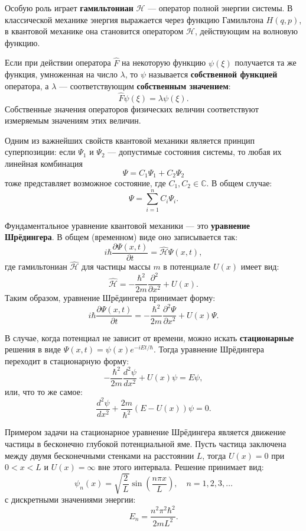 \documentclass[12pt]{article}
\begin{document}
Особую роль играет \textbf{гамильтониан} $\mathcal{H}$ — оператор полной энергии системы. В классической механике энергия выражается через функцию Гамильтона $H(q, p)$, в квантовой механике она становится оператором $\mathcal{H}$, действующим на волновую функцию.

Если при действии оператора $\hat{F}$ на некоторую функцию $\psi(\xi)$ получается та же функция, умноженная на число $\lambda$, то $\psi$ называется \textbf{собственной функцией} оператора, а $\lambda$ — соответствующим \textbf{собственным значением}:
\[
\hat{F} \psi(\xi) = \lambda \psi(\xi).
\]
Собственные значения операторов физических величин соответствуют измеряемым значениям этих величин.

Одним из важнейших свойств квантовой механики является принцип суперпозиции: если $\Psi_1$ и $\Psi_2$ — допустимые состояния системы, то любая их линейная комбинация
\[
\Psi = C_1 \Psi_1 + C_2 \Psi_2
\]
тоже представляет возможное состояние, где $C_1, C_2 \in \mathbb{C}$. В общем случае:
\[
\Psi = \sum_{i=1}^n C_i \Psi_i.
\]

Фундаментальное уравнение квантовой механики — это \textbf{уравнение Шрёдингера}. В общем (временном) виде оно записывается так:
\[
i\hbar \frac{\partial \Psi(x, t)}{\partial t} = \hat{\mathcal{H}} \Psi(x, t),
\]
где гамильтониан $\hat{\mathcal{H}}$ для частицы массы $m$ в потенциале $U(x)$ имеет вид:
\[
\hat{\mathcal{H}} = -\frac{\hbar^2}{2m} \frac{\partial^2}{\partial x^2} + U(x).
\]
Таким образом, уравнение Шрёдингера принимает форму:
\[
i\hbar \frac{\partial \Psi(x, t)}{\partial t} = -\frac{\hbar^2}{2m} \frac{\partial^2 \Psi}{\partial x^2} + U(x)\Psi.
\]

В случае, когда потенциал не зависит от времени, можно искать \textbf{стационарные} решения в виде $\Psi(x, t) = \psi(x)e^{-iEt/\hbar}$. Тогда уравнение Шрёдингера переходит в стационарную форму:
\[
-\frac{\hbar^2}{2m} \frac{d^2 \psi}{dx^2} + U(x)\psi = E\psi,
\]
или, что то же самое:
\[
\frac{d^2 \psi}{dx^2} + \frac{2m}{\hbar^2}(E - U(x))\psi = 0.
\]

Примером задачи на стационарное уравнение Шрёдингера является движение частицы в бесконечно глубокой потенциальной яме. Пусть частица заключена между двумя бесконечными стенками на расстоянии $L$, тогда $U(x) = 0$ при $0 < x < L$ и $U(x) = \infty$ вне этого интервала. Решение принимает вид:
\[
\psi_n(x) = \sqrt{\frac{2}{L}} \sin\left( \frac{n\pi x}{L} \right), \quad n = 1, 2, 3, \ldots
\]
с дискретными значениями энергии:
\[
E_n = \frac{n^2 \pi^2 \hbar^2}{2mL^2}.
\]
\end{document}

